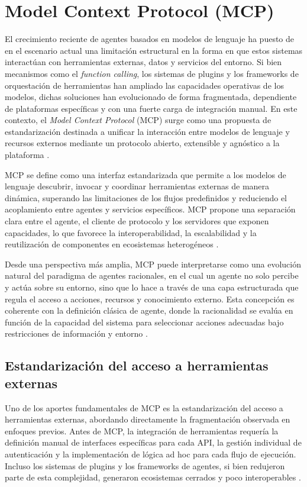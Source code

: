 \documentclass[
	spanish, %
	letterpaper, oneside
]{book}
\begin{document}
\section{Model Context Protocol (MCP)}

El crecimiento reciente de agentes basados en modelos de lenguaje ha puesto de en el escenario actual una limitación estructural en la forma en que estos sistemas interactúan con herramientas externas, datos y servicios del entorno. Si bien mecanismos como el \emph{function calling}, los sistemas de plugins y los frameworks de orquestación de herramientas han ampliado las capacidades operativas de los modelos, dichas soluciones han evolucionado de forma fragmentada, dependiente de plataformas específicas y con una fuerte carga de integración manual. En este contexto, el \emph{Model Context Protocol} (MCP) surge como una propuesta de estandarización destinada a unificar la interacción entre modelos de lenguaje y recursos externos mediante un protocolo abierto, extensible y agnóstico a la plataforma \cite{hou2025mcp}.

MCP se define como una interfaz estandarizada que permite a los modelos de lenguaje descubrir, invocar y coordinar herramientas externas de manera dinámica, superando las limitaciones de los flujos predefinidos y reduciendo el acoplamiento entre agentes y servicios específicos. MCP propone una separación clara entre el agente, el cliente de protocolo y los servidores que exponen capacidades, lo que favorece la interoperabilidad, la escalabilidad y la reutilización de componentes en ecosistemas heterogéneos \cite{hou2025mcp}.

Desde una perspectiva más amplia, MCP puede interpretarse como una evolución natural del paradigma de agentes racionales, en el cual un agente no solo percibe y actúa sobre su entorno, sino que lo hace a través de una capa estructurada que regula el acceso a acciones, recursos y conocimiento externo. Esta concepción es coherente con la definición clásica de agente, donde la racionalidad se evalúa en función de la capacidad del sistema para seleccionar acciones adecuadas bajo restricciones de información y entorno \cite{russell2010aima}.

\subsection{Estandarización del acceso a herramientas externas}

Uno de los aportes fundamentales de MCP es la estandarización del acceso a herramientas externas, abordando directamente la fragmentación observada en enfoques previos. Antes de MCP, la integración de herramientas requería la definición manual de interfaces específicas para cada API, la gestión individual de autenticación y la implementación de lógica ad hoc para cada flujo de ejecución. Incluso los sistemas de plugins y los frameworks de agentes, si bien redujeron parte de esta complejidad, generaron ecosistemas cerrados y poco interoperables \cite{hou2025mcp}.
\end{document}
